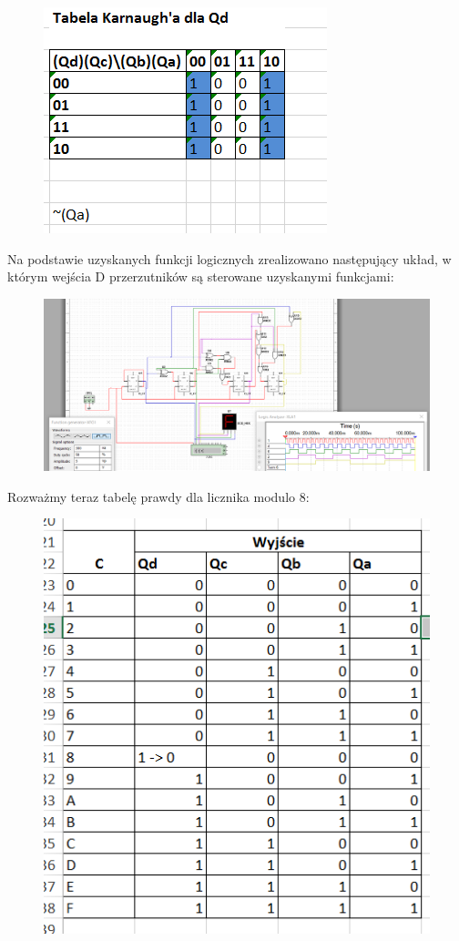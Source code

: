 \documentclass[12pt,a4paper]{article}
\begin{document}
\begin{figure}[H]
\centering
\includegraphics{img/4c_table_4bit_qa}
\end{figure}

Na podstawie uzyskanych funkcji logicznych zrealizowano następujący układ, w którym wejścia D przerzutników są sterowane uzyskanymi funkcjami:


\begin{figure}[H]
\centering
\includegraphics[width=\textwidth]{img/4c_4bit_mod16}
\end{figure}

Rozważmy teraz tabelę prawdy dla licznika modulo 8:

\begin{figure}[H]
\centering
\includegraphics{img/4c_table_4bit_mod8}
\end{figure}
\end{document}
